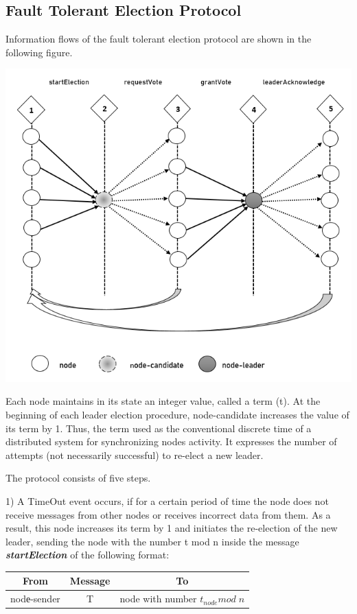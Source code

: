 \documentclass[12pt, a5paper]{article}
\begin{document}
\subsection{Fault Tolerant Election Protocol}
Information flows of the fault tolerant election protocol are shown in the following figure.

\includegraphics[scale=0.5]{1.png}

Each node maintains in its state an integer value, called a term (t). At the beginning of each leader election procedure, node-candidate increases the value of its term by 1. Thus, the term used as  the conventional discrete time of a distributed system for synchronizing nodes activity. It expresses the number of attempts (not necessarily successful) to re-elect a new leader.

The protocol consists of five steps.

1) A TimeOut event occurs, if for a certain period of time the node does not receive messages from other nodes or receives incorrect data from them. As a result, this node increases its term by 1 and initiates the re-election of the new leader, sending the node with the number t mod n inside the message \textbf{\textit{startElection}} of the following format:

\begin{table}[h!]
\begin{center}
\begin{tabular}{|c|c|c|}
\hline
From &  Message & To \\
\hline
\small{nodе-sender} & \small{T} & \small{node with number $t_{node}mod\; n$}\\
\hline
\end{tabular}
\end{center}
\end{table} 
\end{document}
